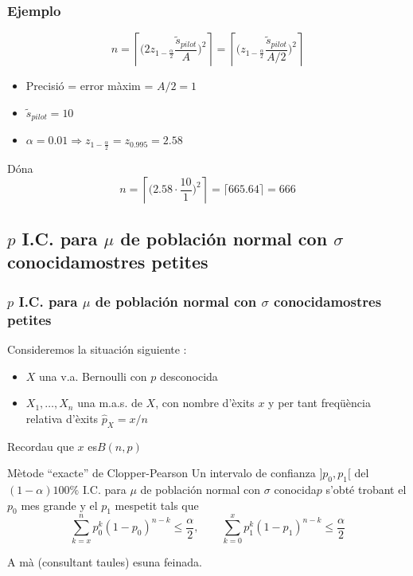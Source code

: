 \documentclass[12pt,t]{beamer}\usepackage[]{graphicx}\usepackage[]{color}
\renewcommand{\leq}{\leqslant}
\theoremstyle{plain}
\theoremstyle{definition}
\begin{document}
\begin{frame}
\frametitle{Ejemplo}

$$
n=
\left\lceil \Big(2z_{1-\frac{\alpha}{2}}\frac{\widetilde{s}_{pilot}}{A}\Big)^2\right\rceil=
\left\lceil \Big(z_{1-\frac{\alpha}{2}}\frac{\widetilde{s}_{pilot}}{A/2}\Big)^2\right\rceil
$$

\begin{itemize}
\item Precisió = error màxim = ${A}/{2}=1$
\medskip

\item $\widetilde{s}_{pilot}=10$
\medskip

\item $\alpha=0.01\Rightarrow z_{1-\frac{\alpha}{2}}=z_{0.995}=2.58$
\end{itemize}
Dóna
$$
n=\left\lceil \Big(2.58\cdot \frac{10}{1}\Big)^2\right\rceil=\lceil 665.64\rceil=666
$$

\end{frame}



\subsection{$p$ I.C. para $\mu$ de población normal con $\sigma$ conocidamostres petites}


\begin{frame}
\frametitle{$p$ I.C. para $\mu$ de población normal con $\sigma$ conocidamostres petites}

Consideremos la situación siguiente  :
\begin{itemize}
\item  $X$ una v.a. Bernoulli con $p$ desconocida

\item $X_1,\ldots,X_n$ una m.a.s. de $X$, con nombre d'èxits $x$ y per tant freqüència relativa d'èxits $\widehat{p}_{X}=x/n$
\end{itemize}

Recordau que $x$ es$B(n,p)$

\begin{block}{Mètode ``exacte'' de Clopper-Pearson}
Un intervalo de confianza  $]p_0,p_1[$ del $(1-\alpha)100\%$ I.C. para $\mu$ de población normal con $\sigma$ conocida$p$ s'obté trobant el $p_0$ mes grande y el $p_1$ mespetit tals que
$$
\displaystyle\sum_{k=x}^np_0^k(1-p_0)^{n-k}\leq \frac{\alpha}{2},\qquad
\displaystyle\sum_{k=0}^xp_1^k(1-p_1)^{n-k}\leq \frac{\alpha}{2}
$$
\end{block}
A mà (consultant taules) esuna feinada.

\end{frame}
\end{document}
